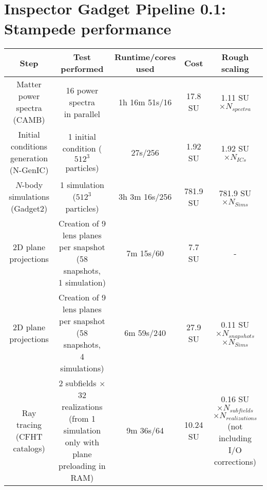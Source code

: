 \documentclass[11pt]{article}
\begin{document}
\section*{Inspector Gadget Pipeline 0.1: Stampede performance}

\begin{table}[h!]
\begin{center}
\begin{tabular}{c|c|c|c|c}
\textbf{Step} & \textbf{Test performed} & \textbf{Runtime/cores used} & \textbf{Cost} & \textbf{Rough scaling} \\ \hline
\pbox{20cm}{Matter power spectra \\ (CAMB)} & \pbox{20cm}{16 power spectra \\ in parallel} & 1h 16m 51s/16 & 17.8 SU & 1.11 SU $\times N_{spectra}$ \\ \hline
\pbox{20cm}{Initial conditions\\ generation (N-GenIC)} & \pbox{20cm}{1 initial condition \\ ($512^3$ particles)} & 27s/256 & 1.92 SU & 1.92 SU $\times N_{ICs}$ \\ \hline
\pbox{20cm}{$N$-body simulations\\ (Gadget2)} & \pbox{20cm}{1 simulation \\ ($512^3$ particles)} & 3h 3m 16s/256 & 781.9 SU & 781.9 SU $\times N_{Sims}$ \\ \hline
2D plane projections & \pbox{20cm}{Creation of 9 lens planes \\ per snapshot (58 snapshots,\\ 1 simulation)} & 7m 15s/60 & 7.7 SU & - \\ \hline
2D plane projections & \pbox{20cm}{Creation of 9 lens planes \\ per snapshot (58 snapshots,\\ 4 simulations)} & 6m 59s/240 & 27.9 SU & \pbox{20cm}{0.11 SU$\times N_{snapshots}$ \\ $\times N_{Sims}$} \\ \hline
\pbox{20cm}{Ray tracing \\ (CFHT catalogs)} & \pbox{20cm}{2 subfields $\times$ 32 realizations \\ (from 1 simulation only \\with plane \\preloading in RAM)} & 9m 36s/64 & 10.24 SU & \pbox{20cm}{0.16 SU $\times N_{subfields}$\\ $\times N_{realizations}$\\ (not including \\ I/O corrections)} \\ \hline

\end{tabular}
\end{center}
\end{table}
\end{document}
